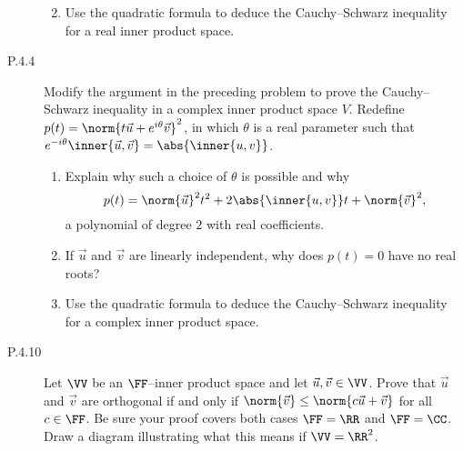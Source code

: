 \documentclass{homework}
\begin{document}
\begin{description}
\begin{enumerate}
\begin{solution}
    \end{solution}

  \item Use the quadratic formula to deduce the Cauchy--Schwarz
    inequality for a real inner product space.

    \begin{solution}

    \end{solution}
  \end{enumerate}

\item[P.4.4]
  Modify the argument in the preceding problem to prove the
  Cauchy--Schwarz inequality in a complex inner product space \(V\).
  Redefine \(p(t) = \norm{t \vec u + e^{i\theta} \vec v}^2\), in which
  \(\theta\) is a real parameter such that
  \(e^{-i\theta} \inner{\vec u, \vec v} = \abs{\inner{u, v}}\).
  \begin{enumerate}
  \item Explain why such a choice of \(\theta\) is possible and why
    \[
      p(t) =
      \norm{\vec u}^2 t^2    +
      2 \abs{\inner{u, v}} t +
      \norm{\vec v}^2,
    \]
    a polynomial of degree \(2\) with real coefficients.

    \begin{solution}

    \end{solution}

  \item If \(\vec u\) and \(\vec v\) are linearly independent, why
    does \(p(t) = 0\) have no real roots?

    \begin{solution}

    \end{solution}

  \item Use the quadratic formula to deduce the Cauchy--Schwarz
    inequality for a complex inner product space.

    \begin{solution}

    \end{solution}
  \end{enumerate}

\item[P.4.10]
  Let \(\VV\) be an \(\FF\)--inner product space and let
  \(\vec u, \vec v \in \VV\).  Prove that \(\vec u\) and \(\vec v\)
  are orthogonal if and only if
  \(\norm{\vec v} \le \norm{c \vec u + \vec v}\) for all
  \(c \in \FF\).  Be sure your proof covers both cases \(\FF = \RR\)
  and \(\FF = \CC\).  Draw a diagram illustrating what this means if
  \(\VV = \RR^2\).


\end{description}
\end{document}

